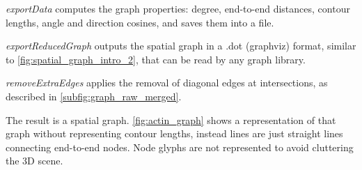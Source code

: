 \textit{exportData} computes the graph properties: degree, end-to-end distances, contour lengths, angle and direction cosines, and saves them into a file.

\textit{exportReducedGraph} outputs the spatial graph in a .dot (graphviz) format, similar to \autoref{fig:spatial_graph_intro_2}, that can be read by any graph library.

\textit{removeExtraEdges} applies the removal of diagonal edges at intersections, as described in \autoref{subfig:graph_raw_merged}.

The result is a spatial graph. \autoref{fig:actin_graph} shows a representation of that graph without representing contour lengths, instead lines are just straight lines connecting end-to-end nodes. Node glyphs are not represented to avoid cluttering the 3D scene.





